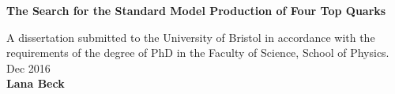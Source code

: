 \titlehead{%
\large{}%
\large{}%
\hfill{}\hbox{School of Physics}
} %


\begin{titlepage}
\begin{center}
\hbox{}
\vfill
{\huge\bfseries The Search for the Standard Model Production of Four Top Quarks

\par} 

\vskip 8cm
A dissertation submitted to the University of Bristol in accordance
with the requirements of the degree of PhD in the Faculty of Science,
School of Physics.\\[2ex]
Dec 2016\\ [2ex]
\vskip 1.5cm
\textbf{Lana Beck}\\
\end{center}
\vfill
\end{titlepage}
